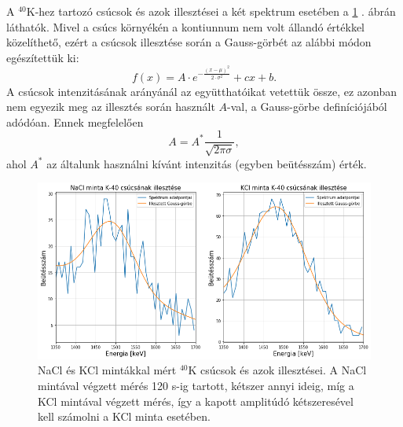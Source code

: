 \documentclass[12pt,a4paper]{article}
\begin{document}
\newline
A $^{40}$K-hez tartozó csúcsok és azok illesztései a két spektrum esetében a \ref{fig:6} . ábrán láthatók. Mivel a csúcs környékén a kontiunnum nem volt állandó értékkel közelíthető, ezért a csúcsok illesztése során a Gauss-görbét az alábbi módon egészítettük ki:
$$f(x)=A\cdot e^{-\frac{(x-\mu)^2}{2\cdot \sigma ^2}} + cx + b  .$$
A csúcsok intenzitásának arányánál az együtthatóikat vetettük össze, ez azonban nem egyezik meg az illesztés során használt $A$-val, a Gauss-görbe definíciójából adódóan. Ennek megfelelően
$$A=A^{*}\frac{1}{\sqrt{2\pi \sigma}},$$
ahol $A^{*}$ az általunk használni kívánt intenzitás (egyben beütésszám) érték.
\newpage
\begin{figure}[!h]
\centering
\includegraphics[scale=0.50]{K40_fits}
\caption{NaCl és KCl mintákkal mért $^{40}$K csúcsok és azok illesztései. A NaCl mintával végzett mérés 120 s-ig tartott, kétszer annyi ideig, míg a KCl mintával végzett mérés, így a kapott amplitúdó kétszeresével kell számolni a KCl minta esetében.}
\label{fig:6}
\end{figure}
\end{document}
